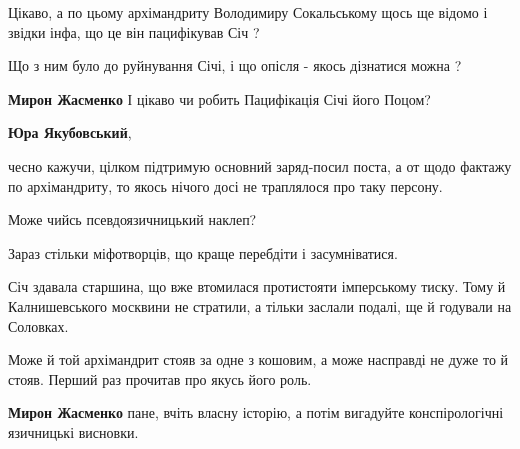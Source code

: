 \begin{itemize}
Цікаво, а по цьому архімандриту Володимиру Сокальському щось ще відомо і звідки
інфа, що це він пацифікував Січ ?

Що з ним було до руйнування Січі, і що опісля - якось дізнатися можна ?

\begin{itemize}
 
\textbf{Мирон Жасменко} І цікаво чи робить Пацифікація Січі його Поцом?

 
\textbf{Юра Якубовський}, 

чесно кажучи, цілком підтримую основний заряд-посил поста, а от щодо фактажу по
архімандриту, то якось нічого досі не траплялося про таку персону.

Може чийсь псевдоязичницький наклеп?

Зараз стільки міфотворців, що краще перебдіти і засумніватися.

Січ здавала старшина, що вже втомилася протистояти імперському тиску. Тому й
Калнишевського москвини не стратили, а тільки заслали подалі, ще й годували на
Соловках.

Може й той архімандрит стояв за одне з кошовим, а може насправді не дуже то й
стояв. Перший раз прочитав про якусь його роль.


 
\textbf{Мирон Жасменко} пане, вчіть власну історію, а потім вигадуйте конспірологічні язичницькі висновки.

 

\end{itemize}
\end{itemize}
